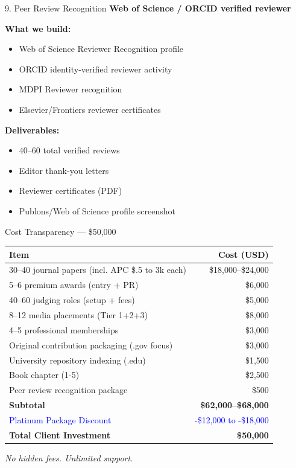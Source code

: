 \documentclass[aspectratio=169, 10pt]{beamer}
\begin{document}
	\begin{frame}{9. Peer Review Recognition}
		\faCheckCircle \hspace{0.2cm} \textbf{Web of Science / ORCID verified reviewer}
		
		\textbf{What we build:}
		\begin{itemize}
			\item Web of Science Reviewer Recognition profile
			\item ORCID identity-verified reviewer activity
			\item MDPI Reviewer recognition
			\item Elsevier/Frontiers reviewer certificates
		\end{itemize}
		
		\textbf{Deliverables:}
		\begin{itemize}
			\item 40–60 total verified reviews
			\item Editor thank-you letters
			\item Reviewer certificates (PDF)
			\item Publons/Web of Science profile screenshot
		\end{itemize}
	\end{frame}
	
	\begin{frame}{Cost Transparency — \$50,000}
		\begin{table}
			\centering
			\scriptsize
			\begin{tabular}{l r}
				\toprule
				Item & Cost (USD) \\
				\midrule
				30–40 journal papers (incl. APC \$.5 to 3k each) & \$18,000–\$24,000 \\
				5–6 premium awards (entry + PR) & \$6,000 \\
				40–60 judging roles (setup + fees) & \$5,000 \\
				8–12 media placements (Tier 1+2+3) & \$8,000 \\
				4–5 professional memberships & \$3,000 \\
				Original contribution packaging (.gov focus) & \$3,000 \\
				University repository indexing (.edu) & \$1,500 \\
				Book chapter (1-5) & \$2,500 \\
				Peer review recognition package & \$500 \\
				\textbf{Subtotal} & \textbf{\$62,000–\$68,000} \\
				\midrule
				\textcolor{blue}{Platinum Package Discount} & \textcolor{blue}{-\$12,000 to -\$18,000} \\
				\textbf{Total Client Investment} & \textbf{\$50,000} \\
				\bottomrule
			\end{tabular}
		\end{table}
		\centering
		\textit{No hidden fees. Unlimited support. }
	\end{frame}
	
\end{document}
